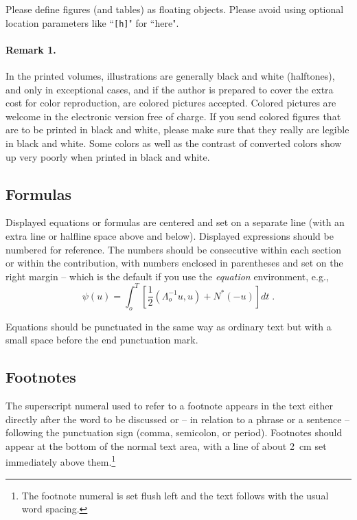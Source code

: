 \documentclass[runningheads,a4paper]{llncs}
\begin{document}
Please define figures (and tables) as floating objects. Please avoid
using optional location parameters like ``\verb+[h]+" for ``here".

\paragraph{Remark 1.}

In the printed volumes, illustrations are generally black and white
(halftones), and only in exceptional cases, and if the author is
prepared to cover the extra cost for color reproduction, are colored
pictures accepted. Colored pictures are welcome in the electronic
version free of charge. If you send colored figures that are to be
printed in black and white, please make sure that they really are
legible in black and white. Some colors as well as the contrast of
converted colors show up very poorly when printed in black and white.

\subsection{Formulas}

Displayed equations or formulas are centered and set on a separate
line (with an extra line or halfline space above and below). Displayed
expressions should be numbered for reference. The numbers should be
consecutive within each section or within the contribution,
with numbers enclosed in parentheses and set on the right margin --
which is the default if you use the \emph{equation} environment, e.g.,
\begin{equation}
  \psi (u) = \int_{o}^{T} \left[\frac{1}{2}
  \left(\Lambda_{o}^{-1} u,u\right) + N^{\ast} (-u)\right] dt \;  .
\end{equation}

Equations should be punctuated in the same way as ordinary
text but with a small space before the end punctuation mark.

\subsection{Footnotes}

The superscript numeral used to refer to a footnote appears in the text
either directly after the word to be discussed or -- in relation to a
phrase or a sentence -- following the punctuation sign (comma,
semicolon, or period). Footnotes should appear at the bottom of
the
normal text area, with a line of about 2~cm set
immediately above them.\footnote{The footnote numeral is set flush left
and the text follows with the usual word spacing.}
\end{document}
